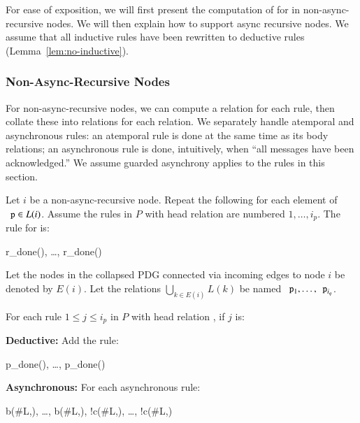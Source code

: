 For ease of exposition, we will first present the computation of  for  in non-async-recursive nodes.  We will then explain how to support async recursive nodes.  We assume that all inductive rules have been rewritten to deductive rules (Lemma~\ref{lem:no-inductive}).

\subsubsection{Non-Async-Recursive Nodes}
\label{sec:nonasyncrecursive}

For non-async-recursive nodes, we can compute a  relation for each rule, then collate these into  relations for each relation.  We separately handle atemporal and asynchronous rules: an atemporal rule is done at the same time as its body relations; an asynchronous rule is done, intuitively, when ``all messages have been acknowledged.''  We assume guarded asynchrony applies to the rules in this section.

Let $i$ be a non-async-recursive node.  Repeat the following for each element of $\dedalus{p} \in L(i)$.
Assume the rules in $P$ with head relation
 are numbered $1, \ldots, i_p$.  The rule for 
is:

\begin{Drules}
        {r_done(), \ldots, r_done()}
\end{Drules}

Let the nodes in the collapsed PDG connected via incoming edges to node $i$ be denoted by $E(i)$.  Let the relations $\bigcup_{k \in E(i)} L(k)$ be named $\dedalus{p}_1, \ldots, \dedalus{p}_{i_q}$.

For each rule $1 \leq j \leq i_p$ in $P$ with head relation , if $j$ is:

\noindent
\textbf{Deductive:}
Add the rule:

\begin{Drules}
        {p_done(), \ldots, p_done()}
\end{Drules}

\noindent
\textbf{Asynchronous:}
For each asynchronous rule:

\begin{Drules}
        {b(#L,), \ldots, b(#L,), !c(#L,), \ldots, !c(#L,)}
\end{Drules}


